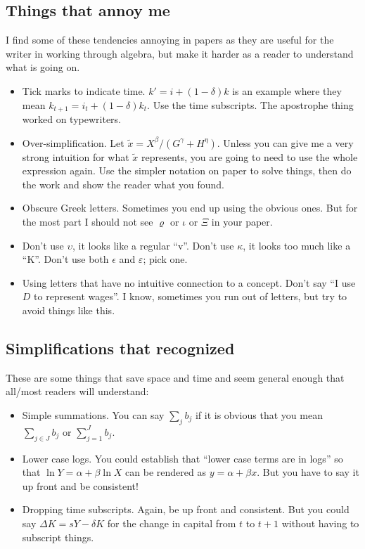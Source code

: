\documentclass{article}
\begin{document}
\subsection*{Things that annoy me}
I find some of these tendencies annoying in papers as they are useful for the writer in working through algebra, but make it harder as a reader to understand what is going on. 

\begin{itemize}
    \item Tick marks to indicate time. $k' = i + (1-\delta)k$ is an example where they mean $k_{t+1} = i_t + (1-\delta)k_t$. Use the time subscripts. The apostrophe thing worked on typewriters. 
    \item Over-simplification. Let $\tilde{x} = X^{\beta}/(G^{\gamma} + H^{\eta})$. Unless you can give me a very strong intuition for what $\tilde{x}$ represents, you are going to need to use the whole expression again. Use the simpler notation on paper to solve things, then do the work and show the reader what you found. 
    \item Obscure Greek letters. Sometimes you end up using the obvious ones. But for the most part I should not see $\varrho$ or $\iota$ or $\Xi$ in your paper.
    \item Don't use $\upsilon$, it looks like a regular ``v''. Don't use $\kappa$, it looks too much like a ``K''. Don't use both $\epsilon$ and $\varepsilon$; pick one. 
    \item Using letters that have no intuitive connection to a concept. Don't say ``I use $D$ to represent wages''. I know, sometimes you run out of letters, but try to avoid things like this. 
\end{itemize}

\subsection*{Simplifications that recognized}
These are some things that save space and time and seem general enough that all/most readers will understand:
\begin{itemize}
    \item Simple summations. You can say $\sum_j b_j$ if it is obvious that you mean $\sum_{j \in J} b_j$ or $\sum_{j=1}^J b_j$. 
    \item Lower case logs. You could establish that ``lower case terms are in logs'' so that $\ln Y = \alpha + \beta \ln X$ can be rendered as $y = \alpha + \beta x$. But you have to say it up front and be consistent!
    \item Dropping time subscripts. Again, be up front and consistent. But you could say $\Delta K = s Y - \delta K$ for the change in capital from $t$ to $t+1$ without having to subscript things. 
\end{itemize}
\end{document}
